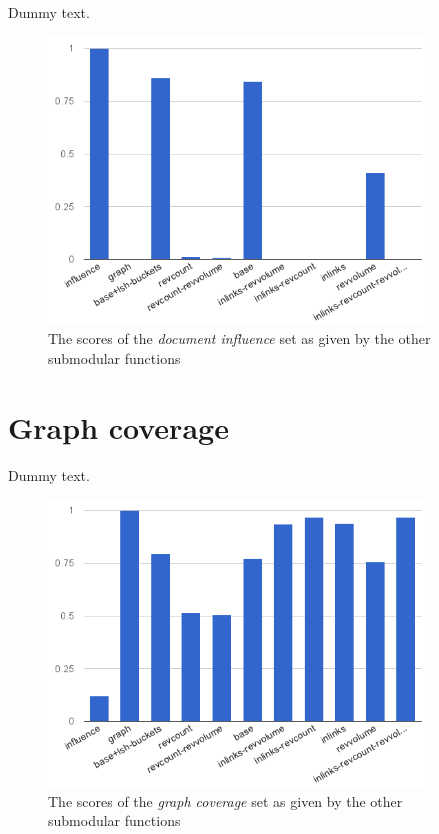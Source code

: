 Dummy text.
\begin{figure}
  \centering
  \includegraphics[width=0.9\textwidth,natwidth=555,natheight=419]{images/infl.png}
  \caption{The scores of the \emph{document influence} set as given by the
  other submodular functions}
  \label{img:infl}
\end{figure}

\section{Graph coverage}

Dummy text.
\begin{figure}
  \centering
  \includegraphics[width=0.9\textwidth,natwidth=555,natheight=419]{images/graph.png}
  \caption{The scores of the \emph{graph coverage} set as given by the other
  submodular functions}
  \label{img:graph}
\end{figure}

